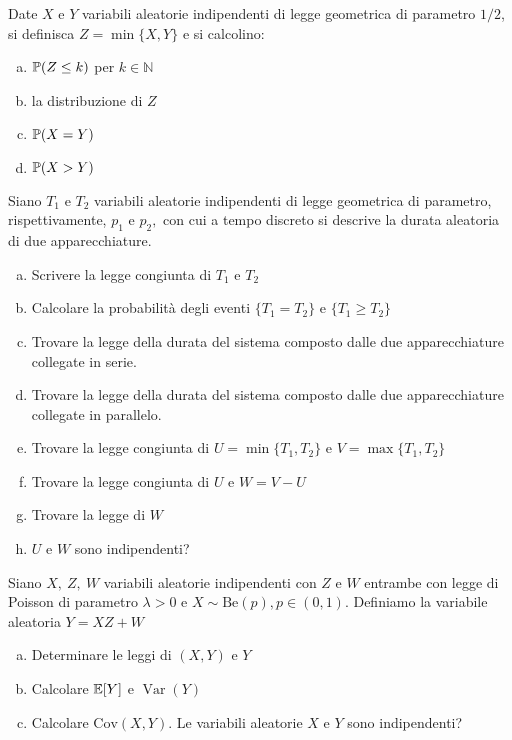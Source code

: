 \Esercizio{}

Date $X$ e $Y$ variabili aleatorie indipendenti di legge geometrica di parametro $1/2$, si definisca $Z=\min \{X,Y\}$ e si calcolino:

\begin{enumerate}[a)]
	\item $\mathbb{P} (Z\leq k)$ per $k\in \mathbb{N}$
	\item la distribuzione di $Z$
	\item $\mathbb{P} (X=Y)$
	\item $\mathbb{P} (X >Y)$
\end{enumerate}

\Esercizio{}

Siano $T_{1}$ e $T_{2}$ variabili aleatorie indipendenti di legge geometrica di parametro, rispettivamente, $p_{1}$ e $p_{2} ,$ con cui a tempo discreto si descrive la durata aleatoria di due apparecchiature.
\begin{enumerate}[a)]
	\item Scrivere la legge congiunta di $T_{1}$ e $T_{2}$
	\item Calcolare la probabilità degli eventi $\{T_{1} =T_{2}\}$ e $\{T_{1} \geq T_{2}\}$
	\item Trovare la legge della durata del sistema composto dalle due apparecchiature collegate in serie.
	\item Trovare la legge della durata del sistema composto dalle due apparecchiature collegate in parallelo.
	\item Trovare la legge congiunta di $U=\min\{T_{1} ,T_{2}\}$ e $V=\max\{T_{1} ,T_{2}\}$
	\item Trovare la legge congiunta di $U$ e $W=V-U$
	\item Trovare la legge di $W$
	\item $U$ e $W$ sono indipendenti?
\end{enumerate}

\Esercizio{}

Siano $X,\ Z,\ W$ variabili aleatorie indipendenti con $Z$ e $W$ entrambe con legge di Poisson di parametro $\lambda  >0$ e $X\sim \mathrm{Be} (p),p\in (0,1)$. Definiamo la variabile aleatoria $Y=XZ+W$
\begin{enumerate}[a)]
	\item Determinare le leggi di $(X,Y)$ e $Y$
	\item Calcolare $\mathbb{E}[Y]$ e $\operatorname{Var} (Y)$
	\item Calcolare $\mathrm{Cov} (X,Y)$. Le variabili aleatorie $X$ e $Y$ sono indipendenti?
\end{enumerate}

